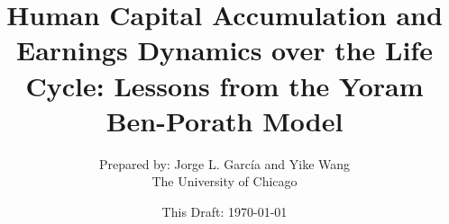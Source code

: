 \documentclass[12pt]{article}
\begin{document}
\title{Human Capital Accumulation and Earnings Dynamics over the Life Cycle: Lessons from the Yoram Ben-Porath Model}
\author{Prepared by: Jorge L. Garc\'{i}a and Yike Wang \\ The University of Chicago}
\date{This Draft: \today}
\maketitle
\clearpage




\clearpage


\end{document}
